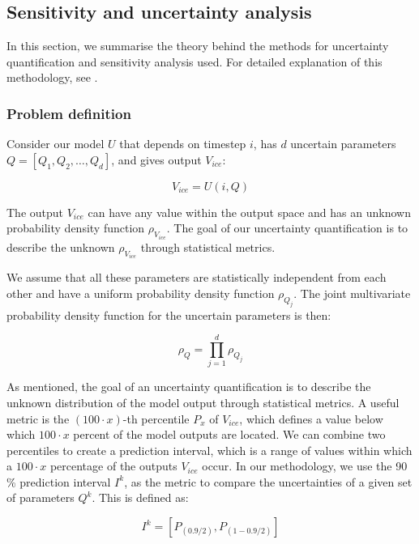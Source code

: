 \documentclass[utf8]{frontiersSCNS}
\begin{document}
\subsection{Sensitivity and uncertainty analysis} \label{sec:uncertainpy}
In this section, we summarise the theory behind the methods for uncertainty quantification and sensitivity
analysis used. For detailed explanation of this methodology, see \cite{uncertainpy_2018}.

\subsubsection{Problem definition}
Consider our model $U$ that depends on timestep $i$, has $d$ uncertain parameters $Q = [Q_1, Q_2, \dots, Q_d]$, and
gives output $V_{ice}$:

\begin{equation}
V_{ice} = U(i,Q)
\end{equation}

The output $V_{ice}$ can have any value within the output space and has an unknown probability density function
$\rho_{V_{ice}}$. The goal of our uncertainty quantification is to describe the unknown $\rho_{V_{ice}}$ through
statistical metrics.

We assume that all these parameters are statistically independent from each other and have a uniform probability
density function $\rho_{Q_j}$. The joint multivariate probability density function for the uncertain parameters
is then:

\begin{equation}
\rho_{Q} = \prod_{j = 1}^{d} \rho_{Q_j}
\end{equation}

As mentioned, the goal of an uncertainty quantification is to describe the unknown distribution of the model
output through statistical metrics. A useful metric is the $(100 \cdot x)$-th percentile $P_x$ of $V_{ice}$,
which defines a value below  which $100 \cdot x$ percent of the model outputs are located. We can combine two
percentiles to create a prediction interval, which is a range of values within which a $100 \cdot x$
percentage of the outputs $V_{ice}$ occur. In our methodology, we use the 90 \% prediction interval $I^k$, as
the metric to compare the uncertainties of a given set of parameters $Q^k$. This is defined as:  

\begin{equation}
I^k = [P_{(0.9/2)}, P_{(1-0.9/2)}]
\end{equation}
\end{document}
